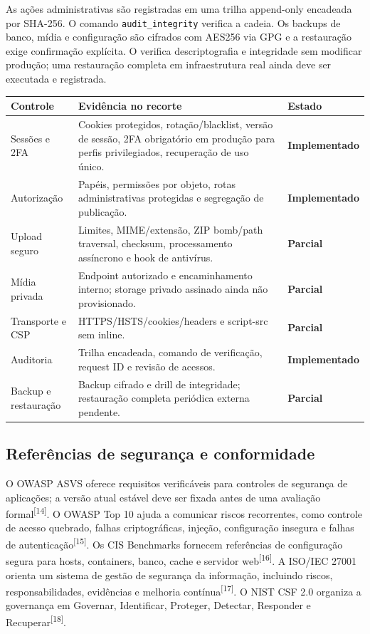 \documentclass[11pt,a4paper]{article}
\newcommand{\internal}[1]{\path{#1}}
\newcommand{\code}[1]{\texttt{#1}}
\newcommand{\ok}{\textcolor{CavnTeal}{\textbf{Implementado}}}
\newcommand{\partialstatus}{\textcolor{CavnGold!80!black}{\textbf{Parcial}}}
\newcommand{\sourcecite}[1]{\textsuperscript{[#1]}}
\begin{document}
As ações administrativas são registradas em uma trilha append-only encadeada por SHA-256. O comando \code{audit\_integrity} verifica a cadeia. Os backups de banco, mídia e configuração são cifrados com AES256 via GPG e a restauração exige confirmação explícita. O \internal{scripts/restore\_drill.sh} verifica descriptografia e integridade sem modificar produção; uma restauração completa em infraestrutura real ainda deve ser executada e registrada.

\begin{longtable}{P{0.26\textwidth}P{0.42\textwidth}P{0.20\textwidth}}
\toprule
\textbf{Controle} & \textbf{Evidência no recorte} & \textbf{Estado} \\
\midrule
\endhead
\bottomrule
\endfoot
Sessões e 2FA & Cookies protegidos, rotação/blacklist, versão de sessão, 2FA obrigatório em produção para perfis privilegiados, recuperação de uso único. & \ok \\
Autorização & Papéis, permissões por objeto, rotas administrativas protegidas e segregação de publicação. & \ok \\
Upload seguro & Limites, MIME/extensão, ZIP bomb/path traversal, checksum, processamento assíncrono e hook de antivírus. & \partialstatus \\
Mídia privada & Endpoint autorizado e encaminhamento interno; storage privado assinado ainda não provisionado. & \partialstatus \\
Transporte e CSP & HTTPS/HSTS/cookies/headers e script-src sem inline. & \partialstatus \\
Auditoria & Trilha encadeada, comando de verificação, request ID e revisão de acessos. & \ok \\
Backup e restauração & Backup cifrado e drill de integridade; restauração completa periódica externa pendente. & \partialstatus \\
\end{longtable}

\subsection{Referências de segurança e conformidade}

O OWASP ASVS oferece requisitos verificáveis para controles de segurança de aplicações; a versão atual estável deve ser fixada antes de uma avaliação formal\sourcecite{14}. O OWASP Top 10 ajuda a comunicar riscos recorrentes, como controle de acesso quebrado, falhas criptográficas, injeção, configuração insegura e falhas de autenticação\sourcecite{15}. Os CIS Benchmarks fornecem referências de configuração segura para hosts, containers, banco, cache e servidor web\sourcecite{16}. A ISO/IEC 27001 orienta um sistema de gestão de segurança da informação, incluindo riscos, responsabilidades, evidências e melhoria contínua\sourcecite{17}. O NIST CSF 2.0 organiza a governança em Governar, Identificar, Proteger, Detectar, Responder e Recuperar\sourcecite{18}.
\end{document}
